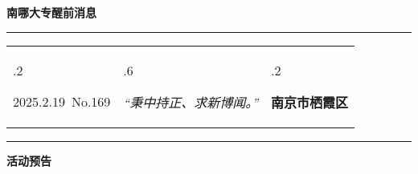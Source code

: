 \documentclass[letterpaper, 12pt]{article}
\begin{document}
\begin{center}
    \Huge\textbf{南哪大专醒前消息}
\end{center}
\vspace{4mm}
\hrule
\renewcommand\tabularxcolumn[1]{m{#1}}
\begin{tabularx}{\textwidth}{>{\hsize.2\hsize}X>{\hsize.6\hsize}X>{\hsize.2\hsize}X}
    \begin{flushleft}
        2025.2.19\, No.169
    \end{flushleft}
    &
    \begin{center}
        \textit{“秉中持正、求新博闻。”}
    \end{center}
    &
    \begin{flushright}
        \textbf{南京市栖霞区}
    \end{flushright}
\end{tabularx}
\vspace{-3.5mm}
\hrule
\vspace{4mm}
\centerline{\huge\textbf{活动预告}}
\end{document}
